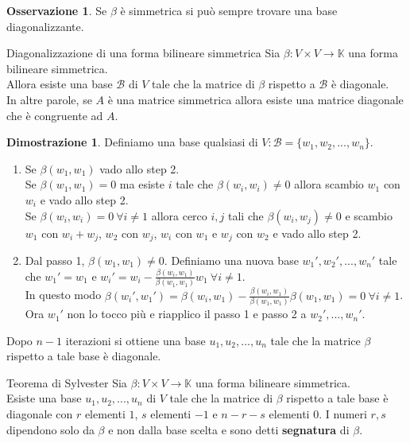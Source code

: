 \documentclass[a4paper]{article}
\theoremstyle{definition}
\newtheorem*{oss}{Osservazione}
\newtheorem*{dimm}{Dimostrazione}
\begin{document}
	\begin{oss}
		Se $\beta$ è simmetrica si può sempre trovare una base diagonalizzante.
	\end{oss}

	\begin{teo}{Diagonalizzazione di una forma bilineare simmetrica}{}
		Sia $\beta: V \times V \to \mathbb{K}$ una forma bilineare simmetrica. \\
		Allora esiste una base $\mathcal{B}$ di $V$ tale che la matrice di $\beta$ rispetto a $\mathcal{B}$ è diagonale. \\
		In altre parole, se $A$ è una matrice simmetrica allora esiste una matrice diagonale che è congruente ad $A$.
	\end{teo}
	\begin{dimm}
		Definiamo una base qualsiasi di $V: \mathcal{B} = \{w_1, w_2, ..., w_n\}$. \\
		\begin{enumerate}
			\item Se $\beta(w_1, w_1)$ vado allo step 2. \\
			Se $\beta(w_1, w_1) = 0$ ma esiste $i$ tale che $\beta(w_i, w_i) \ne 0$ allora scambio $w_1$ con $w_i$ e vado allo step 2. \\
			Se $\beta(w_i, w_i) = 0 \ \forall i \ne 1$ allora cerco $i, j$ tali che $\beta(w_i, w_j) \ne 0$ e scambio $w_1$ con $w_i + w_j$, $w_2$ con $w_j$, $w_i$ con $w_1$ e $w_j$ con $w_2$ e vado allo step 2.
			\item Dal passo 1, $\beta(w_1, w_1) \ne 0$. Definiamo una nuova base $w_1', w_2', ..., w_n'$ tale che $w_1' = w_1$ e $w_i' = w_i - \frac{\beta(w_i, w_1)}{\beta(w_1, w_1)}w_1 \ \forall i \ne 1$. \\
			In questo modo $\beta(w_i', w_1') = \beta(w_i, w_1) - \frac{\beta(w_i, w_1)}{\beta(w_1, w_1)}\beta(w_1, w_1) = 0 \ \forall i \ne 1$. \\
			Ora $w_1'$ non lo tocco più e riapplico il passo 1 e passo 2 a $w_2', ..., w_n'$.
		\end{enumerate}
		Dopo $n - 1$ iterazioni si ottiene una base $u_1, u_2, ..., u_n$ tale che la matrice $\beta$ rispetto a tale base è diagonale.
	\end{dimm}

	\begin{teo}{Teorema di Sylvester}{}
		Sia $\beta: V \times V \to \mathbb{K}$ una forma bilineare simmetrica. \\
		Esiste una base $u_1, u_2, ..., u_n$ di $V$ tale che la matrice di $\beta$ rispetto a tale base è diagonale con $r$ elementi $1$, $s$ elementi $-1$ e $n - r - s$ elementi $0$.
		I numeri $r, s$ dipendono solo da $\beta$ e non dalla base scelta e sono detti \textbf{segnatura} di $\beta$.
	\end{teo}
\end{document}

